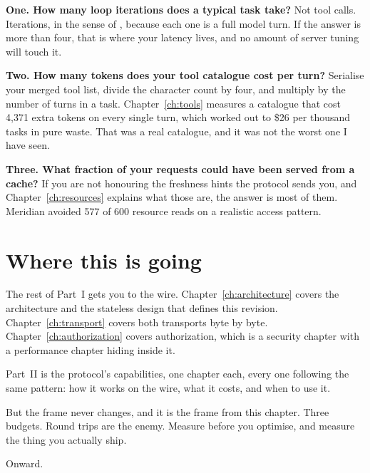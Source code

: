 \textbf{One. How many loop iterations does a typical task take?} Not tool calls.
Iterations, in the sense of , because each one is a full
model turn. If the answer is more than four, that is where your latency lives,
and no amount of server tuning will touch it.

\textbf{Two. How many tokens does your tool catalogue cost per turn?} Serialise
your merged tool list, divide the character count by four, and multiply by the
number of turns in a task. Chapter~\ref{ch:tools} measures a catalogue that cost
4,371 extra tokens on every single turn, which worked out to \$26 per thousand
tasks in pure waste. That was a real catalogue, and it was not the worst one I
have seen.

\textbf{Three. What fraction of your requests could have been served from a
cache?} If you are not honouring the freshness hints the protocol sends you, and
Chapter~\ref{ch:resources} explains what those are, the answer is most of them.
Meridian avoided 577 of 600 resource reads on a realistic access pattern.

\section{Where this is going}

The rest of Part~I gets you to the wire. Chapter~\ref{ch:architecture} covers
the architecture and the stateless design that defines this revision.
Chapter~\ref{ch:transport} covers both transports byte by byte.
Chapter~\ref{ch:authorization} covers authorization, which is a security chapter
with a performance chapter hiding inside it.

Part~II is the protocol's capabilities, one chapter each, every one following
the same pattern: how it works on the wire, what it costs, and when to use it.

But the frame never changes, and it is the frame from this chapter. Three
budgets. Round trips are the enemy. Measure before you optimise, and measure the
thing you actually ship.

Onward.
